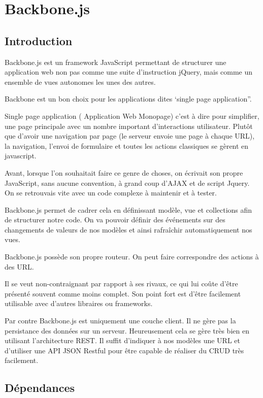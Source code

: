 \section{Backbone.js}
\label{ch:backbone}

\subsection{Introduction}

Backbone.js est un framework JavaScript permettant de structurer une application web non pas comme une suite d’instruction jQuery, mais comme un ensemble de vues autonomes les unes des autres.

Backbone est un bon choix pour les applications dites ‘single page application”.

Single page application ( Application Web Monopage) c’est à dire pour simplifier, une page principale avec un nombre important d'interactions utilisateur. Plutôt que d’avoir une navigation par page (le serveur envoie une page à chaque URL), la navigation, l’envoi de formulaire et toutes les actions classiques se gèrent en javascript.

Avant, lorsque l'on souhaitait faire ce genre de choses, on écrivait son propre JavaScript, sans aucune convention, à grand coup d’AJAX et de script Jquery. On se retrouvais vite avec un code complexe à maintenir et à tester.

Backbone.js permet de cadrer cela en définissant modèle, vue et collections afin de structurer notre code. On va pouvoir définir des événements sur des changements de valeurs de nos modèles et ainsi rafraîchir automatiquement nos vues.

Backbone.js possède son propre routeur. On peut faire correspondre des actions à des URL.

Il se veut non-contraignant par rapport à ses rivaux, ce qui lui coûte d’être présenté souvent comme moins complet. Son point fort est d’être facilement utilisable avec d’autres libraires ou frameworks.

Par contre Backbone.js est uniquement une couche client. Il ne gère pas la persistance des données sur un serveur. Heureusement cela se gère très bien en utilisant l’architecture REST. Il suffit d’indiquer à nos modèles une URL et d’utiliser une API JSON Restful pour être capable de réaliser du CRUD très facilement.


\subsection{Dépendances}


